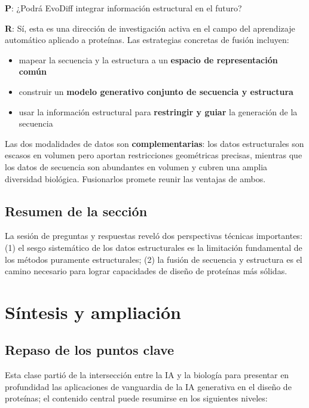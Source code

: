 \documentclass[a4paper]{article}
\begin{document}
\textbf{P}: ¿Podrá EvoDiff integrar información estructural en el futuro?

\textbf{R}: Sí, esta es una dirección de investigación activa en el campo del aprendizaje automático aplicado a proteínas. Las estrategias concretas de fusión incluyen:
\begin{itemize}
    \item mapear la secuencia y la estructura a un \textbf{espacio de representación común}
    \item construir un \textbf{modelo generativo conjunto de secuencia y estructura}
    \item usar la información estructural para \textbf{restringir y guiar} la generación de la secuencia
\end{itemize}

Las dos modalidades de datos son \textbf{complementarias}: los datos estructurales son escasos en volumen pero aportan restricciones geométricas precisas, mientras que los datos de secuencia son abundantes en volumen y cubren una amplia diversidad biológica. Fusionarlos promete reunir las ventajas de ambos.

\subsection{Resumen de la sección}

La sesión de preguntas y respuestas reveló dos perspectivas técnicas importantes: (1) el sesgo sistemático de los datos estructurales es la limitación fundamental de los métodos puramente estructurales; (2) la fusión de secuencia y estructura es el camino necesario para lograr capacidades de diseño de proteínas más sólidas.

\section{Síntesis y ampliación}

\subsection{Repaso de los puntos clave}

Esta clase partió de la intersección entre la IA y la biología para presentar en profundidad las aplicaciones de vanguardia de la IA generativa en el diseño de proteínas; el contenido central puede resumirse en los siguientes niveles:
\end{document}
